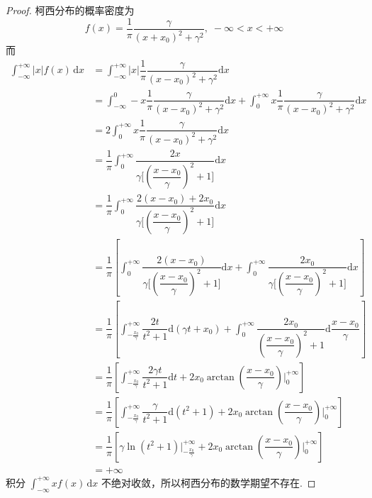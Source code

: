 \begin{proof}
    柯西分布的概率密度为
    $$
    f(x) = \dfrac{1}{\pi} \dfrac{\gamma}{(x + x_0)^2 + \gamma^2},\; -\infty < x < +\infty
    $$
    而
    $$
    \begin{aligned}
        \int_{-\infty}^{+\infty} |x| f(x)\,\text{d}x &= \int_{-\infty}^{+\infty} |x| \dfrac{1}{\pi} \dfrac{\gamma}{(x - x_0)^2 + \gamma^2} \text{d}x \\
        &= \int_{-\infty}^{0} -x \dfrac{1}{\pi} \dfrac{\gamma}{(x - x_0)^2 + \gamma^2} \text{d}x + \int_{0}^{+\infty} x \dfrac{1}{\pi} \dfrac{\gamma}{(x - x_0)^2 + \gamma^2} \text{d}x \\
        &= 2 \int_{0}^{+\infty} x \dfrac{1}{\pi} \dfrac{\gamma}{(x - x_0)^2 + \gamma^2} \text{d}x \\
        &= \dfrac{1}{\pi} \int_{0}^{+\infty} \dfrac{2x}{\gamma \big[(\dfrac{x - x_0}{\gamma})^2 + 1 \big]} \text{d}x \\
        &= \dfrac{1}{\pi} \int_{0}^{+\infty} \dfrac{2(x - x_0) + 2x_0}{\gamma \big[(\dfrac{x - x_0}{\gamma})^2 + 1 \big]} \text{d}x \\
        &= \dfrac{1}{\pi} \left[ \int_{0}^{+\infty} \dfrac{2(x - x_0)}{\gamma \big[ (\dfrac{x - x_0}{\gamma})^2 + 1 \big]} \text{d}x + \int_{0}^{+\infty} \dfrac{2x_0}{\gamma \big[(\dfrac{x - x_0}{\gamma})^2 + 1 \big]} \text{d}x \right] \\
        &= \dfrac{1}{\pi} \left[ \int_{-\frac{x_0}{\gamma}}^{+\infty} \dfrac{2t}{t^2 + 1} \text{d}(\gamma t + x_0) + \int_{0}^{+\infty} \dfrac{2x_0}{(\dfrac{x - x_0}{\gamma})^2 + 1} \text{d} \dfrac{x - x_0}{\gamma} \right] \\
        &= \dfrac{1}{\pi} \left[ \int_{-\frac{x_0}{\gamma}}^{+\infty} \dfrac{2 \gamma t}{t^2 + 1} \text{d}t + 2x_0 \arctan(\dfrac{x - x_0}{\gamma}) \Big|_0^{+\infty} \right] \\
        &= \dfrac{1}{\pi} \left[ \int_{-\frac{x_0}{\gamma}}^{+\infty} \dfrac{\gamma}{t^2 + 1} \text{d} (t^2 + 1) + 2x_0 \arctan(\dfrac{x - x_0}{\gamma}) \Big|_0^{+\infty} \right] \\
        &= \dfrac{1}{\pi} \left[ \gamma \ln(t^2 + 1) \Big|_{-\frac{x_0}{\gamma}}^{+\infty} + 2x_0 \arctan(\dfrac{x - x_0}{\gamma}) \Big|_0^{+\infty} \right] \\
        &= +\infty
    \end{aligned}
    $$
    积分 $\displaystyle\int_{-\infty}^{+\infty} x f(x)\,\text{d}x$ 不绝对收敛，所以柯西分布的数学期望不存在.
\end{proof}

